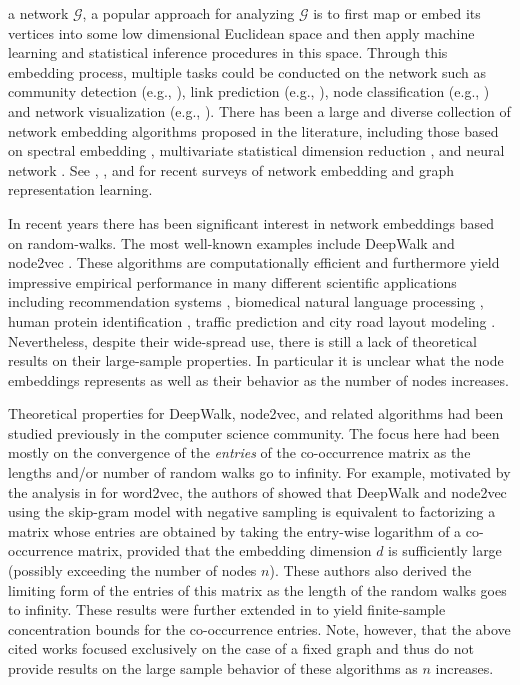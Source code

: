 \documentclass[10pt,journal,compsoc]{IEEEtran}
\numberwithin{equation}{section}
\begin{document}
 a network $\mathcal{G}$, a popular approach for analyzing
$\mathcal{G}$ is to first map or embed its vertices into some low dimensional
Euclidean space and then apply machine
learning and statistical inference procedures in this space. Through this embedding process, multiple tasks could be
conducted on the network such as community detection (e.g.,
\cite{von2007tutorial,wang2017community}), link
prediction (e.g., \cite{liben2007link}), node classification (e.g.,
\cite{perozzi2014deepwalk,hamilton2017inductive}) and
network visualization (e.g., \cite{theocharidis2009network}).
There has been a large and diverse collection of network
embedding algorithms proposed in the literature, including those based
on spectral embedding \cite{rohe2011spectral,sussman2012consistent,shi_malik}, multivariate statistical dimension
reduction \cite{robinson1995typology,ye2005two}, and
neural network \cite{kipf2016semi,line_graph,pine}. See \cite{frame_work}, 
\cite{hamilton2017}, \cite{cui2018survey} and \cite{chen2020graph}
for recent surveys of network embedding and graph representation
learning.

In recent years there has been significant interest in  
network embeddings based on random-walks. The most
well-known examples include DeepWalk \cite{perozzi2014deepwalk} and node2vec
\cite{grover2016node2vec}. These algorithms are computationally
efficient and furthermore yield impressive
empirical performance in many different scientific
applications including recommendation systems \cite{palumbo2018knowledge},
biomedical natural language processing \cite{zhang2019biowordvec}, human protein identification
\cite{zhang2019identification}, traffic prediction
\cite{zheng2020gman} and city road layout modeling
\cite{chu2019neural}. Nevertheless, despite their wide-spread use,
there is still a lack of theoretical results on their large-sample properties. In
particular it is unclear what the node embeddings represents as well
as their behavior as the number of nodes increases. 

Theoretical properties for DeepWalk, node2vec, and related
algorithms had been studied previously in the computer science
community. The focus here had been mostly on the convergence of the 
{\em entries} of the co-occurrence matrix as the lengths and/or number
of random walks go to infinity. For example, motivated by the analysis in \cite{levy2014neural} for word2vec, 
the authors of \cite{qiu2018network,sussman_vec} 
showed that DeepWalk and node2vec using the skip-gram model with negative sampling is equivalent to factorizing a
matrix whose entries are obtained by taking the entry-wise logarithm of
a co-occurrence matrix, provided that the embedding dimension $d$ is
sufficiently large (possibly exceeding the number of nodes $n$). 
These authors also derived the limiting form of the entries of this matrix as the length of the
random walks goes to infinity. 
These results were further extended in \cite{qiu2020concentration} to yield finite-sample concentration bounds for
the co-occurrence entries. %
Note, however, that the above cited works focused
exclusively on the case of a fixed graph and thus do not provide results
on the large sample behavior of these algorithms as $n$ increases.   
\end{document}
